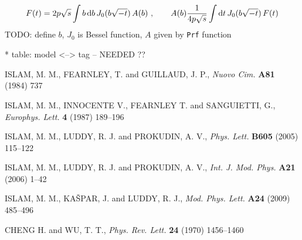 \documentclass[preprint,12pt]{elsarticle}
\def\d{{\rm d}}
\begin{document}
\begin{equation}
F(t) = 2 p \sqrt s \int b\, \d b\, J_0(b \sqrt{-t})\, A(b)\ ,\qquad A(b) {1\over 4p\sqrt s} \int \d t\, J_0(b\sqrt{-t})\,F(t)
\end{equation}
TODO: define $b$, $J_0$ is Bessel function, $A$ given by {\tt Prf} function


* table: model <--> tag -- NEEDED ??



\begin{thebibliography}{00}


\def\Name#1{#1, }
\def\REVIEW#1#2#3#4{{\it #1} {\bf #2} (#3) #4}

	\Name{ISLAM, M. M., FEARNLEY, T. and GUILLAUD, J. P.}
	\REVIEW{Nuovo Cim.}{A81}{1984}{737}

	\Name{ISLAM, M. M., INNOCENTE V., FEARNLEY T. and SANGUIETTI, G.}
	\REVIEW{Europhys. Lett.}{4}{1987}{189--196}


	\Name{ISLAM, M. M., LUDDY, R. J. and PROKUDIN, A. V.}
	\REVIEW{Phys. Lett.}{B605}{2005}{115--122}
    
	\Name{ISLAM, M. M., LUDDY, R. J. and PROKUDIN, A. V.}
	\REVIEW{Int. J. Mod. Phys.}{A21}{2006}{1--42}


	\Name{ISLAM, M. M., KA\v SPAR, J. and LUDDY, R. J.}
	\REVIEW{Mod. Phys. Lett.}{A24}{2009}{485--496}


	\Name{CHENG H. and WU, T. T.}
	\REVIEW{Phys. Rev. Lett.}{24}{1970}{1456--1460}



\end{thebibliography}
\end{document}
